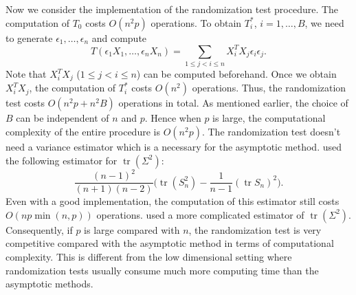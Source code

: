 \documentclass[3p]{elsarticle}
\DeclareMathOperator{\mytr}{tr}
\theoremstyle{plain}
\theoremstyle{definition}
\theoremstyle{remark}
\begin{document}
Now we consider the implementation of the randomization test procedure.
The computation of $T_0$ costs $O(n^2 p)$ operations.
To obtain $T_i^*$, $i=1,\ldots,B$, we need to generate $\epsilon_1,\ldots,\epsilon_n$ and compute
\begin{equation*}
T(\epsilon_1 X_1,\ldots,\epsilon_n X_n)
=\sum_{1\leq j<i \leq n}X_i^T X_j \epsilon_i \epsilon_j.
\end{equation*}
Note that $X_i^T X_j$ ($1\leq j<i\leq n$) can be computed beforehand.
Once we obtain $X_i^T X_j$, the computation of $T_i^*$ costs $O(n^2)$ operations.
Thus, the randomization test costs $O(n^2 p+n^2 B)$ operations in total.
As mentioned earlier, the choice of $B$ can be independent of $n$ and $p$.
Hence when $p$ is large, the computational complexity of the entire procedure is $O(n^2 p)$.
The randomization test doesn't need a variance estimator which is a necessary for the asymptotic method. 
\cite{Bai1996Efiect} used the following estimator for $\mytr(\Sigma^2)$:
$$
\frac{(n-1)^2}{(n+1)(n-2)}\big(\mytr(S_n^2)-\frac{1}{n-1}(\mytr S_n)^2\big).
$$
Even with a good implementation, the computation of this estimator still costs $O(np\min(n,p))$ operations.
\citet{Chen2010A} used a more complicated estimator of $\mytr(\Sigma^2)$.
Consequently, if $p$ is large compared with $n$, the randomization test is very competitive compared with the asymptotic method in terms of computational complexity.
This is different from the low dimensional setting where randomization tests usually consume much more computing time than the asymptotic methods.
\end{document}

